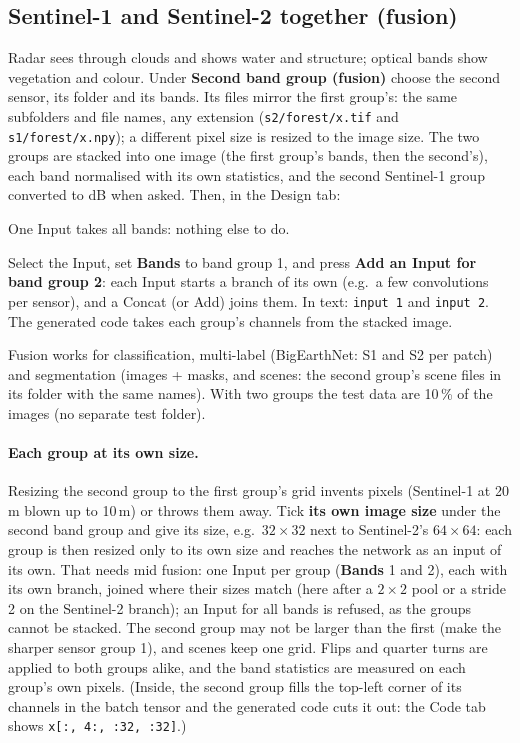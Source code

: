 \documentclass[11pt,a4paper]{article}
\newcommand{\ui}[1]{\textbf{\textsf{#1}}}
\newcommand{\file}[1]{\texttt{#1}}
\begin{document}
\subsection{Sentinel-1 and Sentinel-2 together (fusion)}
\label{sec:fusion}
Radar sees through clouds and shows water and structure; optical bands show vegetation and colour. Under \ui{Second band group (fusion)}
choose the second sensor, its folder and its bands. Its files mirror the first group's: the same subfolders and file names, any
extension (\file{s2/forest/x.tif} and \file{s1/forest/x.npy}); a different pixel size is resized to the image size. The two groups are
stacked into one image (the first group's bands, then the second's), each band normalised with its own statistics, and the second
Sentinel-1 group converted to dB when asked. Then, in the Design tab:
\begin{description}[nosep]
  \item[Early fusion.] One Input takes all bands: nothing else to do.
  \item[Mid fusion.] Select the Input, set \ui{Bands} to band group 1, and press \ui{Add an Input for band group 2}: each Input starts a
        branch of its own (e.g.\ a few convolutions per sensor), and a Concat (or Add) joins them. In text: \texttt{input 1} and
        \texttt{input 2}. The generated code takes each group's channels from the stacked image.
\end{description}
Fusion works for classification, multi-label (BigEarthNet: S1 and S2 per patch) and segmentation (images + masks, and scenes: the
second group's scene files in its folder with the same names). With two groups the test data are 10\,\% of the images (no separate test
folder).

\paragraph{Each group at its own size.} Resizing the second group to the first group's grid invents pixels (Sentinel-1 at 20\,m blown up
to 10\,m) or throws them away. Tick \ui{its own image size} under the second band group and give its size, e.g.\ $32\times32$ next to
Sentinel-2's $64\times64$: each group is then resized only to its own size and reaches the network as an input of its own. That needs
mid fusion: one Input per group (\ui{Bands} 1 and 2), each with its own branch, joined where their sizes match (here after a $2\times2$
pool or a stride 2 on the Sentinel-2 branch); an Input for all bands is refused, as the groups cannot be stacked. The second group may
not be larger than the first (make the sharper sensor group 1), and scenes keep one grid. Flips and quarter turns are applied to both
groups alike, and the band statistics are measured on each group's own pixels. (Inside, the second group fills the top-left corner of
its channels in the batch tensor and the generated code cuts it out: the Code tab shows \texttt{x[:, 4:, :32, :32]}.)
\end{document}
